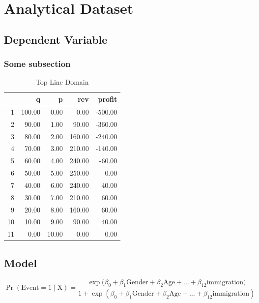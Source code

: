 \documentclass{report}\usepackage[]{graphicx}\usepackage[]{color}
\begin{document}
\section{Analytical Dataset}

\subsection{Dependent Variable}




\subsubsection{Some subsection }


\begin{table}[ht]
\centering
\caption{Top Line Domain} 
\begin{tabular}{rrrrr}
  \hline
 & q & p & rev & profit \\ 
  \hline
1 & 100.00 & 0.00 & 0.00 & -500.00 \\ 
  2 & 90.00 & 1.00 & 90.00 & -360.00 \\ 
  3 & 80.00 & 2.00 & 160.00 & -240.00 \\ 
  4 & 70.00 & 3.00 & 210.00 & -140.00 \\ 
  5 & 60.00 & 4.00 & 240.00 & -60.00 \\ 
  6 & 50.00 & 5.00 & 250.00 & 0.00 \\ 
  7 & 40.00 & 6.00 & 240.00 & 40.00 \\ 
  8 & 30.00 & 7.00 & 210.00 & 60.00 \\ 
  9 & 20.00 & 8.00 & 160.00 & 60.00 \\ 
  10 & 10.00 & 9.00 & 90.00 & 40.00 \\ 
  11 & 0.00 & 10.00 & 0.00 & 0.00 \\ 
   \hline
\end{tabular}
\end{table}

               
                             
\subsection{Model}
\begin{equation}
  \operatorname{Pr}(\text{Event} = 1 \mid \text{X})
 = \frac{\exp(\beta_{0} + \beta_{1} \text{Gender} + \beta_{2} \text{Age} + \dots +
    \beta_{12} \text{immigration)} }{1 + \exp(\beta_{0} + \beta_{1} \text{Gender} + \beta_{2} \text{Age} +
\dots + \beta_{12 }\text{immigration})} \label{eq:glm1} 
\end{equation}
\end{document}

